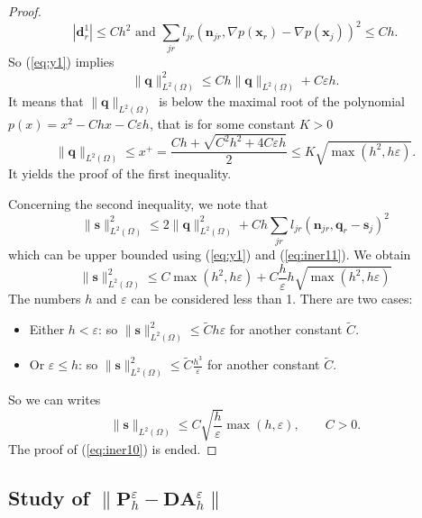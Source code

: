 \documentclass[a4paper,french,english,10pt]{article}
\newcommand\njr{\mathbf{n}_{jr}}
\newcommand\eps{\varepsilon}
\newcommand\x{\mathbf{x}}
\begin{document}
\begin{proof}
$$
\left| \mathbf d_r^1 \right| \leq Ch^2
\mbox{ and }
  \sum_{jr} l_{jr}
\left( \njr, 
 \nabla p(\x_r)
- \nabla p(\x_j)
 \right)^2\leq Ch.
$$
So (\ref{eq:y1}) implies
\begin{equation*} \label{eq:qq1}
\|\mathbf q\|_{L^2(\Omega)}^2\leq Ch 
\|\mathbf q\|_{L^2(\Omega)}+C\varepsilon h.
\end{equation*}  
It means that $\|\mathbf q\|_{L^2(\Omega)}$ is below the maximal root
of the polynomial $p(x)=x^2-Chx-C\eps h$, that is
for some constant $K >0$
\begin{equation} \label{eq:iner11}
\|\mathbf q\|_{L^2(\Omega)}\leq x^+=\frac{Ch+\sqrt{C^2h^2+4C\eps h  }}{2}
\leq K \sqrt{ \max(h^2 , h \eps  )}.
\end{equation}
It yields the proof of the first inequality.

Concerning the second inequality, we note that 
$$
\|\mathbf s\|_{L^2(\Omega)}^2\leq 
2 \|\mathbf q\|_{L^2(\Omega)}^2+ 
Ch \sum_{jr} l_{jr}
\left( \njr, \mathbf q_r - \mathbf s_j  \right)^2
$$
which can be upper bounded using (\ref{eq:y1}) and (\ref{eq:iner11}). We obtain 
$$
\|\mathbf s\|_{L^2(\Omega)}^2
\leq C  { \max(h^2 , h \eps  )}
+ C \frac{h}\eps
h  \sqrt{\max(h^2, h\eps)  } 
$$
The numbers  $h$ and $\eps$ can be considered less than 1.
There are two cases:
\begin{itemize}
\item Either $h<\eps$:  so
$
\|\mathbf s\|_{L^2(\Omega)}^2
\leq \widetilde C  h\eps    
$ for another constant $\widetilde C$.
\item 
Or $\eps\leq h$: so 
$
\|\mathbf s\|_{L^2(\Omega)}^2
\leq \widetilde C \frac{h^3}\eps $
 for another constant $\widetilde C$.
\end{itemize}
So we can writes
$$
\|\mathbf s\|_{L^2(\Omega)}
\leq C \sqrt{ \frac{h}\eps} \max(  h, \eps), \qquad C>0.
$$
The proof of (\ref{eq:iner10}) is ended.
\end{proof}





\subsection{Study of $\| \mathbf P_h^\varepsilon - \mathbf {DA}_h^\eps  \|$}
\end{document}
